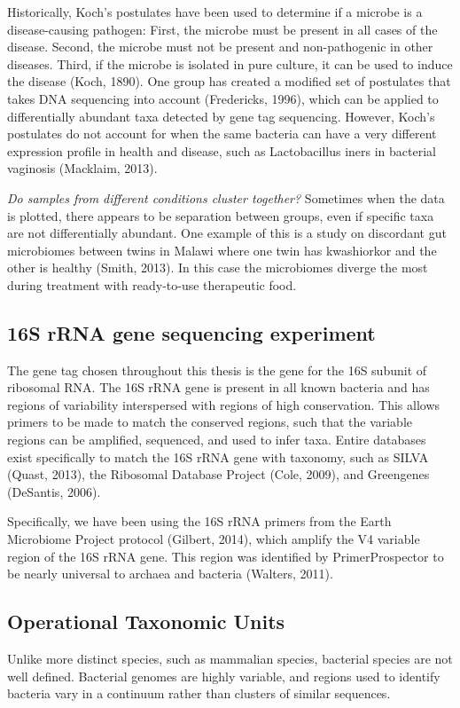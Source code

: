 Historically, Koch’s postulates have been used to determine if a microbe is a disease-causing pathogen: First, the microbe must be present in all cases of the disease. Second, the microbe must not be present and non-pathogenic in other diseases. Third, if the microbe is isolated in pure culture, it can be used to induce the disease (Koch, 1890). One group has created a modified set of postulates that takes DNA sequencing into account (Fredericks, 1996), which can be applied to differentially abundant taxa detected by gene tag sequencing. However, Koch’s postulates do not account for when the same bacteria can have a very different expression profile in health and disease, such as Lactobacillus iners in bacterial vaginosis (Macklaim, 2013).

\textit{Do samples from different conditions cluster together?}
Sometimes when the data is plotted, there appears to be separation between groups, even if specific taxa are not differentially abundant. One example of this is a study on discordant gut microbiomes between twins in Malawi where one twin has kwashiorkor and the other is healthy (Smith, 2013). In this case the microbiomes diverge the most during treatment with ready-to-use therapeutic food.

\subsection{16S rRNA gene sequencing experiment}
The gene tag chosen throughout this thesis is the gene for the 16S subunit of ribosomal RNA. The 16S rRNA gene is present in all known bacteria and has regions of variability interspersed with regions of high conservation. This allows primers to be made to match the conserved regions, such that the variable regions can be amplified, sequenced, and used to infer taxa. Entire databases exist specifically to match the 16S rRNA gene with taxonomy, such as SILVA (Quast, 2013), the Ribosomal Database Project (Cole, 2009), and Greengenes (DeSantis, 2006).

Specifically, we have been using the 16S rRNA primers from the Earth Microbiome Project protocol (Gilbert, 2014), which amplify the V4 variable region of the 16S rRNA gene. This region was identified by PrimerProspector to be nearly universal to archaea and bacteria (Walters, 2011).

\subsection{Operational Taxonomic Units}
Unlike more distinct species, such as mammalian species, bacterial species are not well defined. Bacterial genomes are highly variable, and regions used to identify bacteria vary in a continuum rather than clusters of similar sequences.

